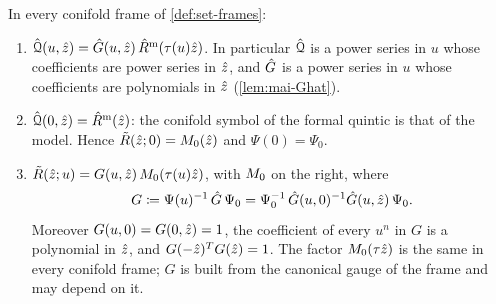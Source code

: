 \begin{cor}[the natural form after $\Dn=1$]
\label{cor:mai-natfact}
In every conifold frame of \cref{def:set-frames}:
\begin{enumerate}
\item[(a)] $\hat{\mathcal{Q}}(u,\hat{z})=\hat{G}(u,\hat{z})\,\hat{R}^{\mathrm m}(\tau(u)\hat{z})$. In particular $\hat{\mathcal{Q}}$ is a power series in $u$ whose coefficients are power series in $\hat{z}$, and $\hat{G}$ is a power series in $u$ whose coefficients are polynomials in $\hat{z}$ (\cref{lem:mai-Ghat}).
\item[(b)] $\hat{\mathcal{Q}}(0,\hat{z})=\hat{R}^{\mathrm m}(\hat{z})$: the conifold symbol of the formal quintic is that of the model. Hence $\tilde R(\hat{z};0)=M_{0}(\hat{z})$ and $\Psi(0)=\Psi_0$.
\item[(c)] $\tilde R(\hat{z};u)=G(u,\hat{z})\,M_{0}(\tau(u)\hat{z})$, with $M_{0}$ on the right, where
\[
G\coloneqq\Psi(u)^{-1}\,\hat{G}\,\Psi_0=\Psi_0^{-1}\,\hat{G}(u,0)^{-1}\hat{G}(u,\hat{z})\,\Psi_0 .
\]
Moreover $G(u,0)=G(0,\hat{z})=1$, the coefficient of every $u^n$ in $G$ is a polynomial in $\hat{z}$, and $G(-\hat{z})^TG(\hat{z})=1$. The factor $M_{0}(\tau\hat{z})$ is the same in every conifold frame; $G$ is built from the canonical gauge of the frame and may depend on it.
\end{enumerate}
\end{cor}

